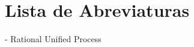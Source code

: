 \chapter*{Lista de Abreviaturas}\label{abrev}
\begin{acronym}
     {-  Rational Unified Process}
\end{acronym}
